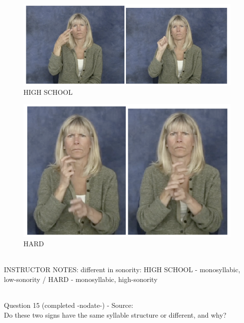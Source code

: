 \documentclass[12pt]{article}
\begin{document}
\begin{figure}[H]
\includegraphics{../images/asl_highschool.png}
\caption{HIGH SCHOOL}
\end{figure}
\begin{figure}[H]
\includegraphics{../images/asl_hard.png}
\caption{HARD}
\end{figure}

~\\
INSTRUCTOR NOTES: different in sonority: HIGH SCHOOL - monosyllabic, low-sonority / HARD - monosyllabic, high-sonority


~\\

{\large Question 15} (completed -nodate-) - Source: \\

Do these two signs have the same syllable structure or different, and why?\\
\end{document}
